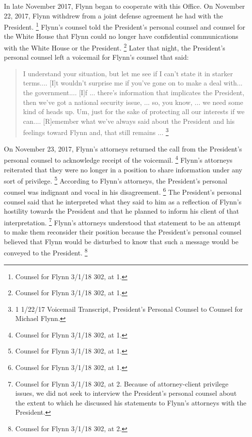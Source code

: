 {In late November 2017, Flynn began to cooperate with this Office.
On November 22, 2017, Flynn withdrew from a joint defense agreement he had with the President.%
\footnote{Counsel for Flynn 3/1/18 302, at 1.}
Flynn's counsel told the President's personal counsel and counsel for the White House that Flynn could no longer have confidential communications with the White House or the President.%
\footnote{Counsel for Flynn 3/1/18 302, at 1.}
Later that night, the President's personal counsel left a voicemail for Flynn's counsel that said:

\begin{quote}
I understand your situation, but let me see if I can't state it in starker terms....
[I]t wouldn't surprise me if you've gone on to make a deal with...
the government....
[I]f ... there's information that implicates the President, then we've got a national security issue, ...
so, you know, ... we need some kind of heads up.
Um, just for the sake of protecting all our interests if we can....
[R]emember what we've always said about the President and his feelings toward Flynn and, that still remains ... %
\footnote{1 1/22/17 Voicemail Transcript, President’s Personal Counsel to Counsel for Michael Flynn.}
\end{quote}

On November 23, 2017, Flynn's attorneys returned the call from the President's personal counsel to acknowledge receipt of the voicemail.%
\footnote{Counsel for Flynn 3/1/18 302, at 1.}
Flynn's attorneys reiterated that they were no longer in a position to share information under any sort of privilege.%
\footnote{Counsel for Flynn 3/1/18 302, at 1.}
According to Flynn's attorneys, the President's personal counsel was indignant and vocal in his disagreement.%
\footnote{Counsel for Flynn 3/1/18 302, at 1.}
The President's personal counsel said that he interpreted what they said to him as a reflection of Flynn's hostility towards the President and that he planned to inform his client of that interpretation.%
\footnote{Counsel for Flynn 3/1/18 302, at 2.
Because of attorney-client privilege issues, we did not seek to interview the President’s personal counsel about the extent to which he discussed his statements to Flynn’s attorneys with the President.}
Flynn's attorneys understood that statement to be an attempt to make them reconsider their position because the President's personal counsel believed that Flynn would be disturbed to know that such a message would be conveyed to the President.%
\footnote{Counsel for Flynn 3/1/18 302, at 2.}

}
